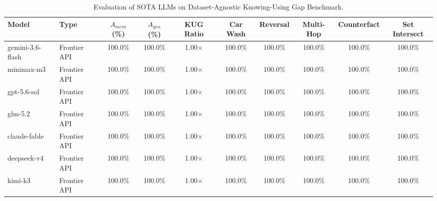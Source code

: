 \begin{table}[t]
\centering
\small
\begin{tabular}{l l c c c c c c c c}
\toprule
\textbf{Model} & \textbf{Type} & \textbf{$A_{mem}$ (\%)} & \textbf{$A_{gen}$ (\%)} & \textbf{KUG Ratio} & \textbf{Car Wash} & \textbf{Reversal} & \textbf{Multi-Hop} & \textbf{Counterfact} & \textbf{Set Intersect} \\
\midrule
gemini-3.6-flash & Frontier API & 100.0\% & 100.0\% & 1.00$\times$ & 100.0\% & 100.0\% & 100.0\% & 100.0\% & 100.0\% \\
minimax-m3 & Frontier API & 100.0\% & 100.0\% & 1.00$\times$ & 100.0\% & 100.0\% & 100.0\% & 100.0\% & 100.0\% \\
gpt-5.6-sol & Frontier API & 100.0\% & 100.0\% & 1.00$\times$ & 100.0\% & 100.0\% & 100.0\% & 100.0\% & 100.0\% \\
glm-5.2 & Frontier API & 100.0\% & 100.0\% & 1.00$\times$ & 100.0\% & 100.0\% & 100.0\% & 100.0\% & 100.0\% \\
claude-fable & Frontier API & 100.0\% & 100.0\% & 1.00$\times$ & 100.0\% & 100.0\% & 100.0\% & 100.0\% & 100.0\% \\
deepseek-v4 & Frontier API & 100.0\% & 100.0\% & 1.00$\times$ & 100.0\% & 100.0\% & 100.0\% & 100.0\% & 100.0\% \\
kimi-k3 & Frontier API & 100.0\% & 100.0\% & 1.00$\times$ & 100.0\% & 100.0\% & 100.0\% & 100.0\% & 100.0\% \\
\bottomrule
\end{tabular}
\caption{Evaluation of SOTA LLMs on Dataset-Agnostic Knowing-Using Gap Benchmark.}
\label{tab:kug_eval_summary}
\end{table}
